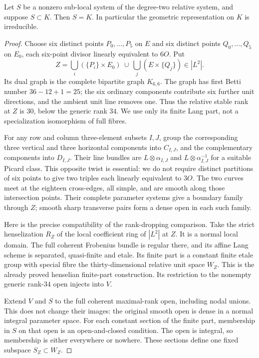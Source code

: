 \begin{lemma}
\label{lem:mixed-degree-two-common-grid-candidate}
Let $S$ be a nonzero sub-local system of the degree-two
relative system, and suppose $S\subset K$. Then $S=K$.
In particular the geometric representation on $K$ is irreducible.
\end{lemma}
\begin{proof}
Choose six distinct points $P_0,\ldots,P_5$ on $E$ and
six distinct points $Q_0,\ldots,Q_5$ on $E_0$, each six-point
divisor linearly equivalent to $6O$. Put
\[
 Z=\bigcup_i(\{P_i\}\times E_0)\ \cup\
   \bigcup_j(E\times\{Q_j\})\in|L^2|.
\]
Its dual graph is the complete bipartite graph $K_{6,6}$.
The graph has first Betti number $36-12+1=25$; the six
ordinary components contribute six further unit directions,
and the ambient unit line removes one. Thus the relative
stable rank at $Z$ is $30$, below the generic rank $34$.
We use only its finite Lang part, not a specialization
isomorphism of full fibres.

For any row and column three-element subsets $I,J$, group
the corresponding three vertical and three horizontal
components into $C_{I,J}$, and the complementary components
into $D_{I,J}$. Their line bundles are
$L\otimes\alpha_{I,J}$ and $L\otimes\alpha_{I,J}^{-1}$
for a suitable Picard class. This opposite twist is essential:
we do not require distinct partitions of six points to
give two triples each linearly equivalent to $3O$.
The two curves meet at the eighteen cross-edges, all simple,
and are smooth along those intersection points.
Their complete parameter systems give a boundary family
through $Z$; smooth sharp transverse pairs form a dense
open in each such family.

Here is the precise compatibility of the rank-dropping
comparison. Take the strict henselization $R_Z$ of the
local coefficient ring of $|L^2|$ at $Z$. It is a normal
local domain. The full coherent Frobenius bundle is
regular there, and its affine Lang scheme is separated,
quasi-finite and etale. Its finite part is a constant
finite etale group with special fibre the thirty-dimensional
relative unit space $W_Z$. This is the already proved
henselian finite-part construction. Its restriction to
the nonempty generic rank-$34$ open injects into $V$.

Extend $V$ and $S$ to the full coherent maximal-rank open,
including nodal unions. This does not change their images:
the original smooth open is dense in a normal integral
parameter space. For each constant section of the finite
part, membership in $S$ on that open is an open-and-closed
condition. The open is integral, so membership is either
everywhere or nowhere. These sections define one fixed
subspace $S_Z\subset W_Z$.


\end{proof}
